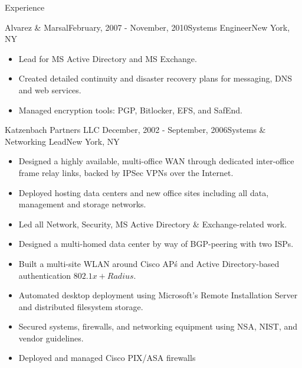 \documentclass{resume} %
\begin{document}
\begin{rSection}{Experience}
\begin{rSubsection}{Alvarez \& Marsal}{February, 2007 - November, 2010}{Systems Engineer}{New York, NY}
  \begin{itemize}
  	\item Lead for MS Active Directory and MS Exchange.
        \item Created detailed continuity and disaster recovery plans for messaging, DNS and web services.
        \item Managed encryption tools: PGP, Bitlocker, EFS, and SafEnd.
  \end{itemize}
\end{rSubsection}
\begin{rSubsection}{Katzenbach Partners LLC }{December, 2002 - September, 2006}{Systems \& Networking Lead}{New York, NY}
  \begin{itemize}
        \item Designed a highly available, multi-office WAN through dedicated inter-office frame relay links, backed by IPSec VPNs over the Internet.
        \item Deployed hosting data centers and new office sites including all data, management and storage networks.
        \item Led all Network, Security, MS Active Directory \& Exchange-related work.
        \item Designed a multi-homed data center by way of BGP-peering with two ISPs.
        \item Built a multi-site WLAN around Cisco AP\'s and Active Directory-based authentication \(802.1x + Radius\).
        \item Automated desktop deployment using Microsoft's Remote Installation Server and distributed filesystem storage.
        \item Secured systems, firewalls, and networking equipment using NSA, NIST, and vendor guidelines.
        \item Deployed and managed Cisco PIX/ASA firewalls 

\end{itemize}
\end{rSubsection}
\end{rSection}
\end{document}
